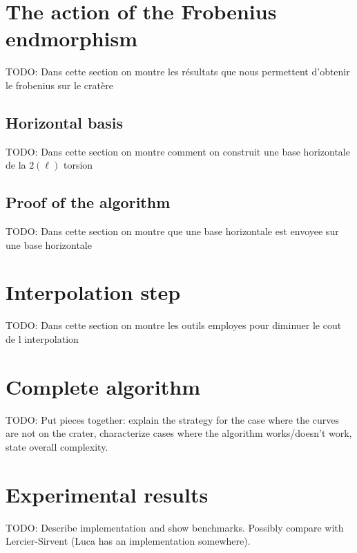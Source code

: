 \documentclass{article}
\newcommand{\todo}[1]{{\color{red}TODO: #1}}
\theoremstyle{plain}
\theoremstyle{definition}
\theoremstyle{remark}
\begin{document}

\section{The action of the Frobenius endmorphism}
\label{sec:acti-frob-endm}
\todo{Dans cette section on montre les résultats que nous permettent d'obtenir le frobenius sur le cratère}
\subsection{Horizontal basis}
\todo{Dans cette section on montre comment on construit une base horizontale de la $2(\ell)$ torsion}
\subsection{Proof of the algorithm}
\todo{Dans cette section on montre que une base horizontale est envoyee sur une base horizontale}


\section{Interpolation step}
\label{sec:interpolation}
\todo{Dans cette section on montre les outils employes pour diminuer le cout de l interpolation}


\section{Complete algorithm}
\label{sec:complete-algorithm}
\todo{Put pieces together: explain the strategy for the case where the
  curves are not on the crater, characterize cases where the algorithm
  works/doesn't work, state overall complexity.}


\section{Experimental results}
\label{sec:implem}

\todo{Describe implementation and show benchmarks. Possibly compare
  with Lercier-Sirvent (Luca has an implementation somewhere).}



\end{document}
